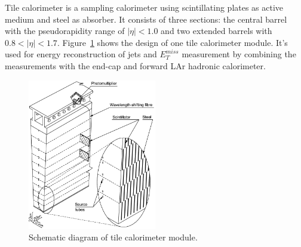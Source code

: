 Tile calorimeter is a sampling calorimeter using scintillating plates as active medium and steel as absorber.
It consists of three sections: the central barrel with the pseudorapidity range of $|\eta|<1.0$ and two extended barrels with $0.8 < |\eta| < 1.7$.
Figure~\ref{fig:calo_tile} shows the design of one tile calorimeter module.
It's used for energy reconstruction of jets and $E_{T}^{miss}$ measurement by combining the measurements with the end-cap and forward LAr hadronic calorimeter.
\begin{figure}[!htb]
  \centering
  \includegraphics[width=0.5\textwidth]{figures/Detector/calo_tile.png}
  \caption{Schematic diagram of tile calorimeter module\cite{Aad:2010}.}
  \label{fig:calo_tile}
\end{figure}

